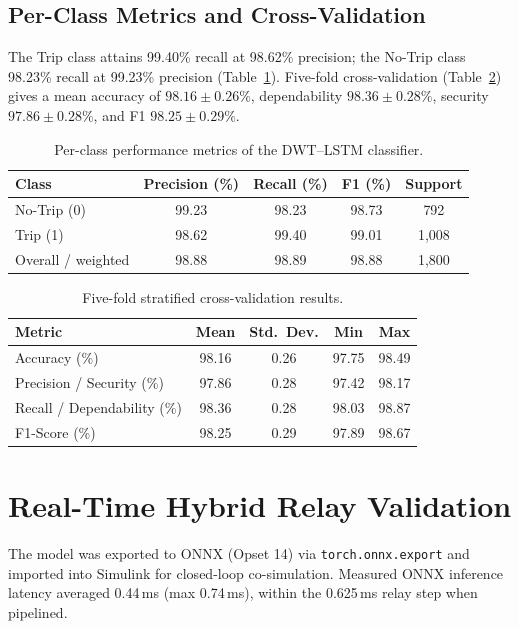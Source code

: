 \documentclass[12pt,a4paper,oneside]{report}
\begin{document}
\subsection{Per-Class Metrics and Cross-Validation}
The Trip class attains 99.40\% recall at 98.62\% precision; the No-Trip class 98.23\% recall at 99.23\% precision (Table~\ref{tab:6.4}). Five-fold cross-validation (Table~\ref{tab:6.5}) gives a mean accuracy of $98.16\pm0.26\%$, dependability $98.36\pm0.28\%$, security $97.86\pm0.28\%$, and F1 $98.25\pm0.29\%$.
\begin{table}[H]\centering\caption{Per-class performance metrics of the DWT--LSTM classifier.}\label{tab:6.4}
\begin{tabular}{@{}lcccc@{}}\toprule \textbf{Class} & \textbf{Precision (\%)} & \textbf{Recall (\%)} & \textbf{F1 (\%)} & \textbf{Support}\\ \midrule
No-Trip (0) & 99.23 & 98.23 & 98.73 & 792\\
Trip (1) & 98.62 & 99.40 & 99.01 & 1{,}008\\ \midrule
Overall / weighted & 98.88 & 98.89 & 98.88 & 1{,}800\\ \bottomrule
\end{tabular}\end{table}
\begin{table}[H]\centering\caption{Five-fold stratified cross-validation results.}\label{tab:6.5}
\begin{tabular}{@{}lcccc@{}}\toprule \textbf{Metric} & \textbf{Mean} & \textbf{Std.\ Dev.} & \textbf{Min} & \textbf{Max}\\ \midrule
Accuracy (\%) & 98.16 & 0.26 & 97.75 & 98.49\\
Precision / Security (\%) & 97.86 & 0.28 & 97.42 & 98.17\\
Recall / Dependability (\%) & 98.36 & 0.28 & 98.03 & 98.87\\
F1-Score (\%) & 98.25 & 0.29 & 97.89 & 98.67\\ \bottomrule
\end{tabular}\end{table}

\section{Real-Time Hybrid Relay Validation}
The model was exported to ONNX (Opset 14) via \texttt{torch.onnx.export} and imported into Simulink for closed-loop co-simulation. Measured ONNX inference latency averaged 0.44\,ms (max 0.74\,ms), within the 0.625\,ms relay step when pipelined.
\end{document}

